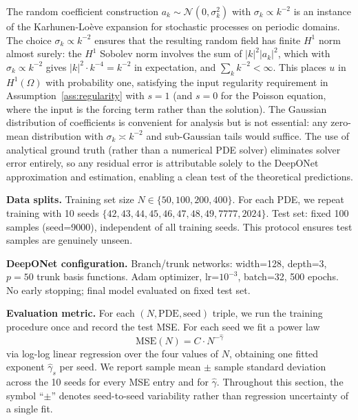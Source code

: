 \documentclass[12pt,a4paper]{article}
\begin{document}
The random coefficient construction $a_k \sim \mathcal{N}(0, \sigma_k^2)$ with
$\sigma_k \propto k^{-2}$ is an instance of the Karhunen-Lo\`eve expansion for
stochastic processes on periodic domains.  The choice $\sigma_k \propto k^{-2}$
ensures that the resulting random field has finite $H^1$ norm almost surely:
the $H^1$ Sobolev norm involves the sum of $|k|^2 |a_k|^2$, which with
$\sigma_k \propto k^{-2}$ gives $|k|^2 \cdot k^{-4} = k^{-2}$ in expectation,
and $\sum_{k} k^{-2} < \infty$.  This places $u$ in $H^1(\Omega)$ with
probability one, satisfying the input regularity requirement in
Assumption~\ref{ass:regularity} with $s=1$ (and $s=0$ for the Poisson equation,
where the input is the forcing term rather than the solution).  The Gaussian
distribution of coefficients is convenient for analysis but is not essential:
any zero-mean distribution with $\sigma_k \asymp k^{-2}$ and sub-Gaussian tails
would suffice.  The use of analytical ground truth (rather than a numerical PDE
solver) eliminates solver error entirely, so any residual error is attributable
solely to the DeepONet approximation and estimation, enabling a clean test of
the theoretical predictions.

\textbf{Data splits.}  Training set size $N \in \{50, 100, 200, 400\}$.
For each PDE, we repeat training with 10 seeds
$\{42,43,44,45,46,47,48,49,7777,2024\}$.
Test set: fixed 100 samples (seed=9000), independent of all training seeds.
This protocol ensures test samples are genuinely unseen.

\textbf{DeepONet configuration.}  Branch/trunk networks: width=128, depth=3,
$p=50$ trunk basis functions.  Adam optimizer, lr=$10^{-3}$, batch=32,
500 epochs.  No early stopping; final model evaluated on fixed test set.

\textbf{Evaluation metric.}  For each $(N, \text{PDE}, \text{seed})$ triple,
we run the training procedure once and record the test MSE.  For each seed we fit a power law
\begin{equation}
    \text{MSE}(N) = C \cdot N^{-\hat\gamma}
    \label{eq:power_law}
\end{equation}
via log-log linear regression over the four values of $N$,
obtaining one fitted exponent $\hat\gamma_s$ per seed.
We report sample mean $\pm$ sample standard deviation across the 10 seeds
for every MSE entry and for $\hat\gamma$.
Throughout this section, the symbol ``$\pm$'' denotes seed-to-seed variability
rather than regression uncertainty of a single fit.
\end{document}
